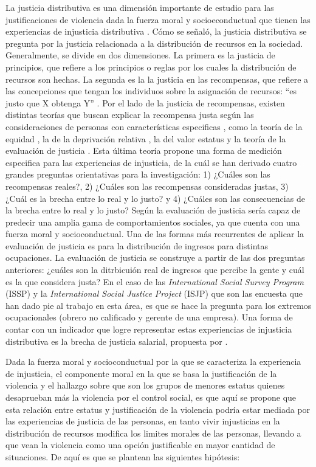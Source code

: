 \documentclass[12pt,twoside]{templates/facsothesis}
\begin{document}
La justicia distributiva es una dimensión importante de estudio para las justificaciones de violencia dada la fuerza moral y socioeconductual que tienen las experiencias de injusticia distributiva \citep{Jasso2015}. Cómo se señaló, la justicia distributiva se pregunta por la justicia relacionada a la distribución de recursos en la sociedad. Generalmente, se divide en dos dimensiones. La primera es la justicia de principios, que refiere a los principios o reglas por los cuales la distribución de recursos son hechas. La segunda es la la justicia en las recompensas, que refiere a las concepciones que tengan los individuos sobre la asignación de recursos: ``es justo que X obtenga Y'' \citep{Castillo2009}. Por el lado de la justicia de recompensas, existen distintas teorías que buscan explicar la recompensa justa según las consideraciones de personas con características especificas \citep{Castillo2011}, como la teoría de la equidad \citep{Adams1963, Homans1961}, la de la deprivación relativa \citep{Runciman1966}, la del valor estatus \citep{Berger1989} y la teoría de la evaluación de justicia \citep{Jasso1980}. Esta última teoría propone una forma de medición especifica para las experiencias de injusticia, de la cuál se han derivado cuatro grandes preguntas orientativas para la investigación: 1) ¿Cuáles son las recompensas reales?, 2) ¿Cuáles son las recompensas consideradas justas, 3) ¿Cuál es la brecha entre lo real y lo justo? y 4) ¿Cuáles son las consecuencias de la brecha entre lo real y lo justo? Según \citet{Jasso2015} la evaluación de justicia sería capaz de predecir una amplia gama de comportamientos sociales, ya que cuenta con una fuerza moral y socioconductual. Una de las formas más recurrentes de aplicar la evaluación de justicia es para la distribución de ingresos para distintas ocupaciones. La evaluación de justicia se construye a partir de las dos preguntas anteriores: ¿cuáles son la ditrbicuión real de ingresos que percibe la gente y cuál es la que considera justa? En el caso de las \emph{International Social Survey Program} (ISSP) y la \emph{International Social Justice Project} (ISJP) que son las encuesta que han dado pie al trabajo en esta área, es que se hace la pregunta para los extremos ocupacionales (obrero no calificado y gerente de una empresa). Una forma de contar con un indicador que logre representar estas experiencias de injusticia distributiva es la brecha de justicia salarial, propuesta por \citet{Verwiebe2000}.

Dada la fuerza moral y socioconductual por la que se caracteriza la experiencia de injusticia, el componente moral en la que se basa la justificación de la violencia y el hallazgo sobre que son los grupos de menores estatus quienes desaprueban más la violencia por el control social, es que aquí se propone que esta relación entre estatus y justificación de la violencia podría estar mediada por las experiencias de justicia de las personas, en tanto vivir injusticias en la distribución de recursos modifica los limites morales de las personas, llevando a que vean la violencia como una opción justificable en mayor cantidad de situaciones. De aquí es que se plantean las siguientes hipótesis:
\end{document}

